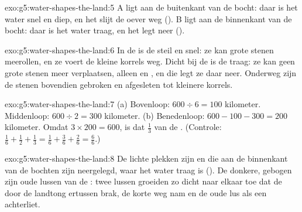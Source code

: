 \begin{solution}{exo:g5:water-shapes-the-land:5}
A ligt aan de buitenkant van de bocht: daar is het water snel en diep, en
het slijt de oever weg (). B ligt aan de binnenkant van de bocht:
daar is het water traag, en het legt  neer ().
\end{solution}

\begin{solution}{exo:g5:water-shapes-the-land:6}
In de  is de  steil en snel: ze kan grote stenen meerollen, en
ze voert de kleine korrels weg. Dicht bij de  is de  traag: ze
kan geen grote stenen meer verplaatsen, alleen  en , en die legt ze
daar neer. Onderweg zijn de stenen bovendien gebroken en afgesleten tot
kleinere korrels.
\end{solution}

\begin{solution}{exo:g5:water-shapes-the-land:7}
(a) Bovenloop: $600 \div 6 = 100$ kilometer. Middenloop:
$600 \div 2 = 300$ kilometer. (b) Benedenloop: $600 - 100 - 300 = 200$
kilometer. Omdat $3 \times 200 = 600$, is dat $\frac{1}{3}$ van de .
(Controle: $\frac{1}{6} + \frac{1}{2} + \frac{1}{3} = \frac{1}{6} +
\frac{3}{6} + \frac{2}{6} = \frac{6}{6}$.)
\end{solution}

\begin{solution}{exo:g5:water-shapes-the-land:8}
De lichte plekken zijn  en  die aan de binnenkant van de bochten
zijn neergelegd, waar het water traag is (). De donkere, gebogen
 zijn oude lussen van de : twee lussen groeiden zo dicht naar
elkaar toe dat de  door de landtong ertussen brak, de korte weg nam
en de oude lus als een  achterliet.
\end{solution}

